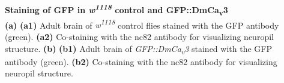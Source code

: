 \label{fig:S1} 
\textbf{Staining of GFP in \emph{w\textsuperscript{1118}} control and GFP::DmCa\textsubscript{v}3}
\\ 
\textbf{(a)} \textbf{(a1)} Adult brain of \emph{w\textsuperscript{1118}} control flies stained with the GFP antibody (green).
\textbf{(a2)} Co-staining with the nc82 antibody for visualizing neuropil structure.
\textbf{(b)} \textbf{(b1)} Adult brain of \emph{GFP::DmCa\textsubscript{v}3} stained with the GFP antibody (green).
\textbf{(b2)} Co-staining with the nc82 antibody for visualizing neuropil structure.